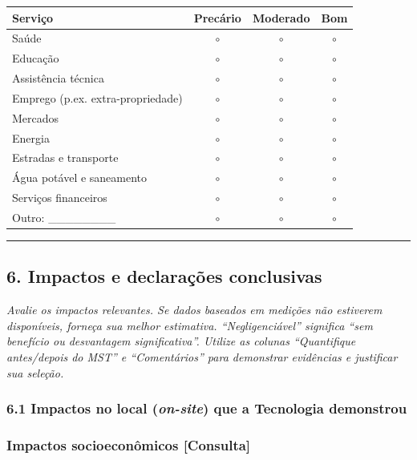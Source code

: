 {
\begin{longtable}[]{@{}lccc@{}}
\toprule\noalign{}
Serviço & Precário & Moderado & Bom \\
\midrule\noalign{}
\endhead
\bottomrule\noalign{}
\endlastfoot
Saúde & $\circ$ & $\circ$ & $\circ$ \\
Educação & $\circ$ & $\circ$ & $\circ$ \\
Assistência técnica & $\circ$ & $\circ$ & $\circ$ \\
Emprego (p.ex. extra-propriedade) & $\circ$ & $\circ$ & $\circ$ \\
Mercados & $\circ$ & $\circ$ & $\circ$ \\
Energia & $\circ$ & $\circ$ & $\circ$ \\
Estradas e transporte & $\circ$ & $\circ$ & $\circ$ \\
Água potável e saneamento & $\circ$ & $\circ$ & $\circ$ \\
Serviços financeiros & $\circ$ & $\circ$ & $\circ$ \\
Outro: \_\_\_\_\_\_\_\_ & $\circ$ & $\circ$ & $\circ$ \\
\end{longtable}
}

\newpage

\begin{center}\rule{0.5\linewidth}{0.5pt}\end{center}

\subsection{6. Impactos e declarações conclusivas}\label{impactos-e-declarauxe7uxf5es-conclusivas}

\emph{Avalie os impactos relevantes. Se dados baseados em medições não estiverem disponíveis, forneça sua melhor estimativa. ``Negligenciável'' significa ``sem benefício ou desvantagem significativa''. Utilize as colunas ``Quantifique antes/depois do MST'' e ``Comentários'' para demonstrar evidências e justificar sua seleção.}

\subsubsection{\texorpdfstring{6.1 Impactos no local (\emph{on-site}) que a Tecnologia demonstrou}{6.1 Impactos no local (on-site) que a Tecnologia demonstrou}}\label{impactos-no-local-on-site-que-a-tecnologia-demonstrou}

\subsubsection{Impactos socioeconômicos {[Consulta]}}\label{impactos-socioeconuxf4micos}

